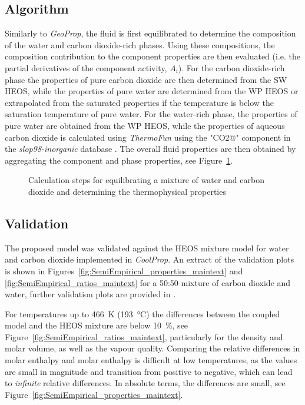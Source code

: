 \subsection{Algorithm}
\label{sec:algorithm}
    Similarly to \emph{GeoProp}, the fluid is first equilibrated to determine the composition of the water and carbon dioxide-rich phases. Using these compositions, the composition contribution to the component properties are then evaluated (i.e. the partial derivatives of the component activity, \(A_i\)). For the carbon dioxide-rich phase the properties of pure carbon dioxide are then determined from the \ac{SW} \ac{HEOS}, while the properties of pure water are determined from the \ac{WP} \ac{HEOS} or extrapolated from the saturated properties if the temperature is below the saturation temperature of pure water. For the water-rich phase, the properties of pure water are obtained from the \ac{WP} \ac{HEOS}, while the properties of aqueous carbon dioxide is calculated using \emph{ThermoFun} using the "CO2@" component in the \emph{slop98-inorganic} database \cite{Johnson1992}. The overall fluid properties are then obtained by aggregating the component and phase properties, see Figure~\ref{fig:coupled_model}.


    \begin{figure}[H]
        \centering
        
        \caption{Calculation steps for equilibrating a mixture of water and carbon dioxide and determining the thermophysical properties}
        \label{fig:coupled_model}
    \end{figure}

\subsection{Validation}
\label{sec:SemiEmpirical_validation}
    The proposed model was validated against the \ac{HEOS} mixture model for water and carbon dioxide implemented in \emph{CoolProp}. An extract of the validation plots is shown in Figures~\ref{fig:SemiEmpirical_properties_maintext} and \ref{fig:SemiEmpirical_ratios_maintext} for a 50:50 mixture of carbon dioxide and water, further validation plots are provided in .

    For temperatures up to \qty{466}{\K} (\qty{193}{\degreeCelsius}) the differences between the coupled model and the \ac{HEOS} mixture are below \qty{10}{\percent}, see Figure~\ref{fig:SemiEmpirical_ratios_maintext}, particularly for the density and molar volume, as well as the vapour quality. Comparing the relative differences in molar enthalpy and molar enthalpy is difficult at low temperatures, as the values are small in magnitude and transition from positive to negative, which can lead to \emph{infinite} relative differences. In absolute terms, the differences are small, see Figure~\ref{fig:SemiEmpirical_properties_maintext}.

